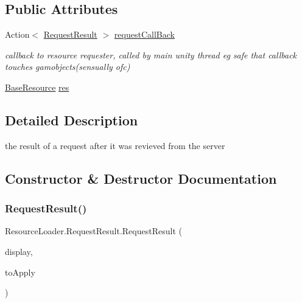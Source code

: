 \subsection*{Public Attributes}
\begin{DoxyCompactItemize}
\item 
Action$<$ \mbox{\hyperlink{struct_resource_loader_1_1_request_result}{Request\+Result}} $>$ \mbox{\hyperlink{struct_resource_loader_1_1_request_result_a5fc428ab3bd32cff753734f7c9f55620}{request\+Call\+Back}}
\begin{DoxyCompactList}\small\item\em callback to resource requester, called by main unity thread eg safe that callback touches gamobjects(sensually ofc) \end{DoxyCompactList}\item 
\mbox{\hyperlink{class_base_resource}{Base\+Resource}} \mbox{\hyperlink{struct_resource_loader_1_1_request_result_acf9eab09a9d18dad45a9990026bfaea1}{res}}
\end{DoxyCompactItemize}


\subsection{Detailed Description}
the result of a request after it was revieved from the server 



\subsection{Constructor \& Destructor Documentation}
\mbox{\label{struct_resource_loader_1_1_request_result_ad45093e71854563c37697c621b1ae5a7}} 
\subsubsection{\texorpdfstring{Request\+Result()}{RequestResult()}}
{\footnotesize\ttfamily Resource\+Loader.\+Request\+Result.\+Request\+Result (\begin{DoxyParamCaption}\item[{Action$<$ \mbox{\hyperlink{struct_resource_loader_1_1_request_result}{Request\+Result}} $>$}]{display,  }\item[{\mbox{\hyperlink{class_base_resource}{Base\+Resource}}}]{to\+Apply }\end{DoxyParamCaption})}



